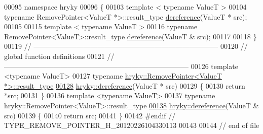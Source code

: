 \begin{DoxyCode}
00095 \textcolor{keyword}{namespace }hryky
00096 \{
00103     \textcolor{keyword}{template} < \textcolor{keyword}{typename} ValueT >
00104     \textcolor{keyword}{typename} RemovePointer<ValueT *>::result\_type \hyperlink{group__generic__programming_ga74adf3223a4335c89d64f985d0bcc29e}{dereference}(ValueT * src);
00105 
00115     \textcolor{keyword}{template} < \textcolor{keyword}{typename} ValueT >
00116     \textcolor{keyword}{typename} RemovePointer<ValueT>::result\_type \hyperlink{group__generic__programming_ga74adf3223a4335c89d64f985d0bcc29e}{dereference}(ValueT & src);
00117 
00118 \}
00119 \textcolor{comment}{//
      ------------------------------------------------------------------------------}
00120 \textcolor{comment}{// global function definitions}
00121 \textcolor{comment}{//
      ------------------------------------------------------------------------------}
00126 \textcolor{comment}{}\textcolor{keyword}{template} <\textcolor{keyword}{typename} ValueT>
00127 \textcolor{keyword}{typename} \hyperlink{classhryky_1_1_remove_pointer}{hryky::RemovePointer<ValueT *>::result_type}
\hypertarget{type__remove__pointer_8h_source_l00128}{}\hyperlink{group__generic__programming_ga74adf3223a4335c89d64f985d0bcc29e}{00128} \hyperlink{group__generic__programming_ga74adf3223a4335c89d64f985d0bcc29e}{hryky::dereference}(ValueT * src)
00129 \{
00130     \textcolor{keywordflow}{return} *src;
00131 \}
00136 \textcolor{keyword}{template} <\textcolor{keyword}{typename} ValueT>
00137 \textcolor{keyword}{typename} hryky::RemovePointer<ValueT>::result\_type
\hypertarget{type__remove__pointer_8h_source_l00138}{}\hyperlink{group__generic__programming_ga4ea1ee0ac8835fd32da649ee7dea3355}{00138} \hyperlink{group__generic__programming_ga74adf3223a4335c89d64f985d0bcc29e}{hryky::dereference}(ValueT & src)
00139 \{
00140     \textcolor{keywordflow}{return} src;
00141 \}
00142 \textcolor{preprocessor}{#endif // TYPE\_REMOVE\_POINTER\_H\_20120226104330113}
00143 \textcolor{preprocessor}{}
00144 \textcolor{comment}{// end of file}
\end{DoxyCode}
